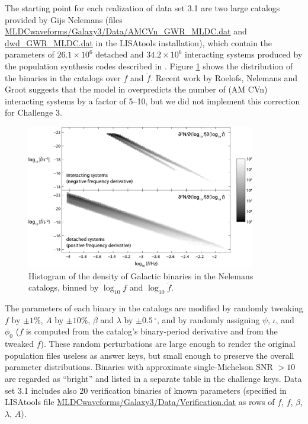 \documentclass{iopart}
\begin{document}
The starting point for each realization of data set 3.1 are two large catalogs provided by Gijs Nelemans (files \url{MLDCwaveforms/Galaxy3/Data/AMCVn_GWR_MLDC.dat} and \url{dwd_GWR_MLDC.dat} in the LISAtools installation), which contain the parameters of $26.1 \times 10^6$ detached and $34.2 \times 10^6$ interacting systems produced by the population synthesis codes described in \cite{Nelemans:2001hp, Nelemans:2003ha}. Figure \ref{fig:binaries} shows the distribution of the binaries in the catalogs over $f$ and $\dot{f}$. Recent work by Roelofs, Nelemans and Groot \cite{Roelofs:2007rn} suggests that the model in \cite{Nelemans:2003ha} overpredicts the number of (AM CVn) interacting systems by a factor of 5--10, but we did not implement this correction for Challenge 3. 
%
\begin{figure}
\centerline{\includegraphics[width=10cm]{densities2b-r}}
\caption{Histogram of the density of Galactic binaries in the Nelemans catalogs, binned by $\log_{10} f$ and $\log_{10} \dot{f}$.\label{fig:binaries}}
\end{figure}

The parameters of each binary in the catalogs are modified by randomly tweaking $f$ by $\pm 1\%$, $A$ by $\pm 10\%$, $\beta$ and $\lambda$ by $\pm 0.5\, {}^\circ$, and by randomly assigning $\psi$, $\iota$, and $\phi_0$ ($\dot{f}$ is computed from the catalog's binary-period derivative and from the tweaked $f$). These random perturbations are large enough to render the original population files useless as answer keys, but small enough to preserve the overall parameter distributions. Binaries with approximate single-Michelson SNR $> 10$ are regarded as ``bright'' and listed in a separate table in the challenge keys. Data set 3.1 includes also 20 verification binaries of known parameters (specified in LISAtools file \url{MLDCwaveforms/Galaxy3/Data/Verification.dat} as rows of $f$, $\dot{f}$, $\beta$, $\lambda$, $A$).
\end{document}
